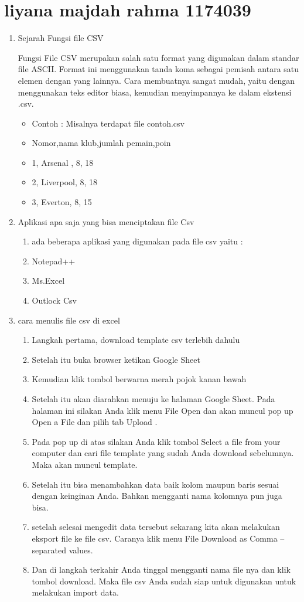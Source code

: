 \section{liyana majdah rahma 1174039}
\begin{enumerate}
\item{Sejarah Fungsi file CSV}
\par Fungsi File CSV merupakan salah satu format yang digunakan dalam standar file ASCII. Format ini menggunakan tanda koma sebagai pemisah antara satu elemen dengan yang lainnya. 
Cara membuatnya  sangat mudah, yaitu dengan menggunakan teks editor biasa, kemudian menyimpannya ke dalam ekstensi .csv.
\begin{itemize}
\item Contoh : Misalnya terdapat file contoh.csv
\item Nomor,nama klub,jumlah pemain,poin
\item 1, Arsenal , 8, 18
\item 2, Liverpool, 8, 18
\item 3, Everton, 8, 15 
\end{itemize}
 
\item{Aplikasi apa saja yang bisa menciptakan file Csv}
\begin {enumerate}
	\item ada beberapa aplikasi yang digunakan pada file csv yaitu :
	\item Notepad++
	\item Ms.Excel
	\item Outlock Csv
		\end {enumerate}
	
\item{cara menulis file csv di excel}
	\begin{enumerate}
		\item Langkah pertama, download template csv terlebih dahulu
		\item Setelah itu buka browser ketikan Google Sheet
		\item Kemudian klik tombol berwarna merah pojok kanan bawah
		\item Setelah itu akan diarahkan menuju ke halaman Google Sheet. Pada halaman ini silakan Anda klik menu File Open dan akan muncul pop up Open a File dan pilih tab Upload .
		\item Pada pop up di atas silakan Anda klik tombol Select a file from your computer dan cari file template yang sudah Anda download sebelumnya. Maka akan muncul template.
		\item Setelah itu bisa menambahkan data baik kolom maupun baris sesuai dengan keinginan Anda. Bahkan mengganti nama kolomnya pun juga bisa.
		\item setelah selesai mengedit data tersebut sekarang kita akan melakukan eksport file ke file csv. Caranya klik menu File Download as Comma – separated values.
		\item Dan di langkah terkahir Anda tinggal mengganti nama file nya dan klik tombol download. Maka file csv Anda sudah siap untuk digunakan untuk melakukan import data.
	\end{enumerate}


\end{enumerate}
